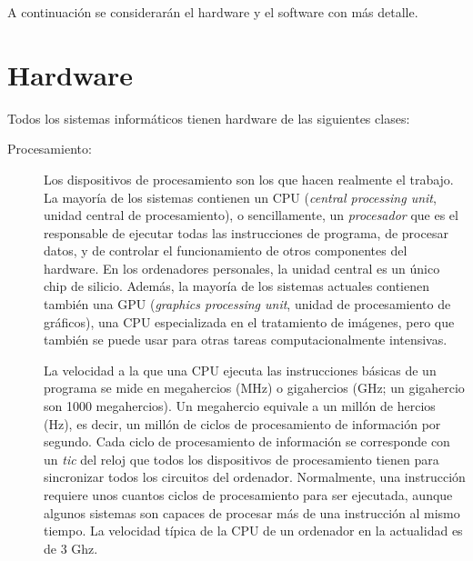 A continuación se considerarán el hardware y el software con más detalle. 

\section{Hardware} 

Todos los sistemas informáticos tienen hardware de las siguientes clases: 

\begin{description} \item[Procesamiento:] Los dispositivos de procesamiento son los que hacen realmente el trabajo. La mayoría de los sistemas contienen un CPU ({\em central processing unit}, unidad central de procesamiento), o sencillamente, un \emph{procesador} que es el responsable de ejecutar todas las instrucciones de programa, de procesar datos, y de controlar el funcionamiento de otros componentes del hardware. En los ordenadores personales, la unidad central es un único chip de silicio. Además, la mayoría de los sistemas actuales contienen también una GPU (\emph{graphics processing unit}, unidad de procesamiento de gráficos), una CPU especializada en el tratamiento de imágenes, pero que también se puede usar para otras tareas computacionalmente intensivas. 

La velocidad a la que una CPU ejecuta las instrucciones básicas de un programa se mide en
megahercios (MHz) o gigahercios (GHz; un gigahercio son 1000 megahercios). Un
megahercio equivale a un millón de hercios (Hz), es decir, un millón de ciclos de procesamiento de información por segundo. Cada ciclo de procesamiento de información se corresponde con un \emph{tic} del reloj que todos los dispositivos de procesamiento tienen para sincronizar todos los circuitos del ordenador. Normalmente, una instrucción requiere unos cuantos ciclos de procesamiento para ser ejecutada, aunque algunos sistemas son capaces de procesar más de una instrucción al mismo tiempo. La velocidad típica de la CPU de un ordenador en la actualidad es de 3 Ghz. 


\end{description}
